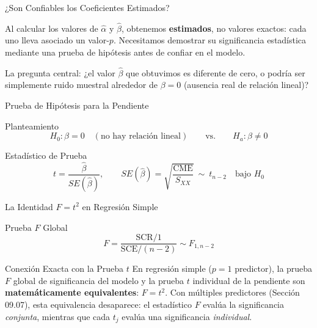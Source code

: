 \documentclass[10pt, aspectratio=169]{beamer}
\begin{document}
\begin{frame}{¿Son Confiables los Coeficientes Estimados?}
  \footnotesize
  \begin{motivacion}
    Al calcular los valores de $\hat\alpha$ y $\hat\beta$, obtenemos \textbf{estimados}, no valores exactos: cada uno lleva asociado un valor-$p$. Necesitamos demostrar su significancia estadística mediante una prueba de hipótesis antes de confiar en el modelo.
  \end{motivacion}

  \vspace{0.15cm}
  \pause
  La pregunta central: ¿el valor $\hat\beta$ que obtuvimos es diferente de cero, o podría ser simplemente ruido muestral alrededor de $\beta=0$ (ausencia real de relación lineal)?
\end{frame}

\begin{frame}{Prueba de Hipótesis para la Pendiente}
  \footnotesize
  \begin{block}{Planteamiento}
    $$H_0:\beta=0 \quad (\text{no hay relación lineal}) \qquad \text{vs.} \qquad H_a:\beta\neq0$$
  \end{block}
  \pause

  \vspace{0.1cm}
  \begin{alertblock}{Estadístico de Prueba}
    $$t=\frac{\hat\beta}{SE(\hat\beta)}, \qquad SE(\hat\beta)=\sqrt{\frac{\text{CME}}{S_{XX}}} \ \sim\ t_{n-2} \quad\text{bajo } H_0$$
  \end{alertblock}
\end{frame}

\begin{frame}{La Identidad $F=t^2$ en Regresión Simple}
  \footnotesize
  \begin{block}{Prueba $F$ Global}
    $$F=\frac{\text{SCR}/1}{\text{SCE}/(n-2)} \sim F_{1,n-2}$$
  \end{block}
  \pause

  \vspace{0.1cm}
  \begin{alertblock}{Conexión Exacta con la Prueba $t$}
    En regresión simple ($p=1$ predictor), la prueba $F$ global de significancia del modelo y la prueba $t$ individual de la pendiente son \textbf{matemáticamente equivalentes}: $F=t^2$. Con múltiples predictores (Sección 09.07), esta equivalencia desaparece: el estadístico $F$ evalúa la significancia \emph{conjunta}, mientras que cada $t_j$ evalúa una significancia \emph{individual}.
  \end{alertblock}
\end{frame}
\end{document}
